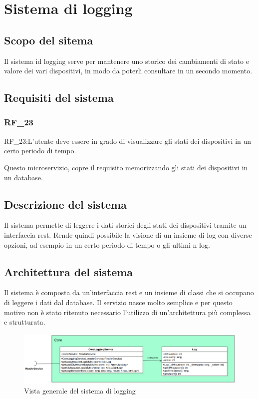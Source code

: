 \chapter{Sistema di logging}\label{cap:microservizio-logging}

\section{Scopo del sitema}

Il sistema id logging serve per mantenere uno storico dei cambiamenti di stato e valore dei vari dispositivi, in modo da poterli consultare in un secondo momento. 

\section{Requisiti del sistema}

\subsection{RF\_23}

RF\_23:L'utente deve essere in grado di visualizzare gli stati dei dispositivi in un certo periodo di tempo.

Questo microservizio, copre il requisito memorizzando gli stati dei dispositivi in un database.

\section{Descrizione del sistema}
Il sistema permette di leggere i dati storici degli stati dei dispositivi tramite un interfaccia rest. Rende quindi possibile la visione di un insieme di log con diverse opzioni, ad esempio in un certo periodo di tempo o gli ultimi n log.

\section{Architettura del sistema}

Il sistema è composta da un'interfaccia rest e un insieme di classi che si occupano di leggere i dati dal database.
Il servizio nasce molto semplice e per questo motivo non è stato ritenuto necessario l'utilizzo di un'architettura più complessa e strutturata.

\begin{figure}[ht]
    \centering
    \includegraphics[width=\textwidth]{img/classi_logging.png}
    \caption{Vista generale del sistema di logging}
    \label{fig:general_logging}
\end{figure}

